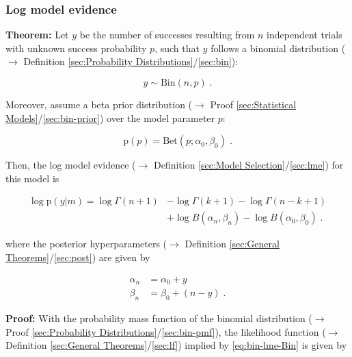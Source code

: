 \documentclass[a4paper,12pt,twoside]{book}
\begin{document}
\subsubsection[\textbf{Log model evidence}]{Log model evidence} \label{sec:bin-lme}
\setcounter{equation}{0}

\textbf{Theorem:} Let $y$ be the number of successes resulting from $n$ independent trials with unknown success probability $p$, such that $y$ follows a binomial distribution ($\rightarrow$ Definition \ref{sec:Probability Distributions}/\ref{sec:bin}):

\begin{equation} \label{eq:bin-lme-Bin}
y \sim \mathrm{Bin}(n,p) \; .
\end{equation}

Moreover, assume a beta prior distribution ($\rightarrow$ Proof \ref{sec:Statistical Models}/\ref{sec:bin-prior}) over the model parameter $p$:

\begin{equation} \label{eq:bin-lme-Bin-prior}
\mathrm{p}(p) = \mathrm{Bet}(p; \alpha_0, \beta_0) \; .
\end{equation}

Then, the log model evidence ($\rightarrow$ Definition \ref{sec:Model Selection}/\ref{sec:lme}) for this model is

\begin{equation} \label{eq:bin-lme-Bin-LME}
\begin{split}
\log \mathrm{p}(y|m) = \log \Gamma(n+1) &- \log \Gamma(k+1) - \log \Gamma(n-k+1) \\
&+ \log B(\alpha_n,\beta_n) - \log B(\alpha_0,\beta_0) \; .
\end{split}
\end{equation}

where the posterior hyperparameters ($\rightarrow$ Definition \ref{sec:General Theorems}/\ref{sec:post}) are given by

\begin{equation} \label{eq:bin-lme-Bin-post-par}
\begin{split}
\alpha_n &= \alpha_0 + y \\
\beta_n &= \beta_0 + (n-y) \; .
\end{split}
\end{equation}


\vspace{1em}
\textbf{Proof:} With the probability mass function of the binomial distribution ($\rightarrow$ Proof \ref{sec:Probability Distributions}/\ref{sec:bin-pmf}), the likelihood function ($\rightarrow$ Definition \ref{sec:General Theorems}/\ref{sec:lf}) implied by \eqref{eq:bin-lme-Bin} is given by
\end{document}

